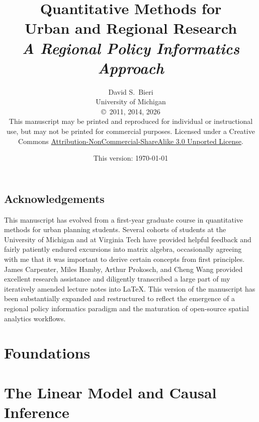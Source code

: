 \documentclass[12pt, a4paper, oneside, openany]{book}
\title{\huge\textbf{Quantitative Methods for\\Urban and Regional Research}\\[10pt]
       \Large\textit{A Regional Policy Informatics Approach}}
\author{\Large David S.\ Bieri\\[4pt]
        \normalsize University of Michigan\\[6pt]
        \footnotesize\copyright~2011, 2014, 2026\\[2pt]
        \scriptsize This manuscript may be printed and reproduced for individual
        or instructional use, but may not be printed for commercial purposes.
        Licensed under a Creative Commons
        \href{http://creativecommons.org/licenses/by-nc-sa/3.0/deed.en_US}{%
        Attribution-NonCommercial-ShareAlike 3.0 Unported License}.}
\date{This version: \today}
\begin{document}
\maketitle
\frontmatter
\setcounter{tocdepth}{2}
\setcounter{page}{3}

\chapter*{Acknowledgements}
This manuscript has evolved from a first-year graduate course in quantitative
methods for urban planning students. Several cohorts of students at the
University of Michigan and at Virginia Tech have provided helpful feedback and
fairly patiently endured excursions into matrix algebra, occasionally agreeing
with me that it was important to derive certain concepts from first principles.
James Carpenter, Miles Hamby, Arthur Prokosch, and Cheng Wang provided
excellent research assistance and diligently transcribed a large part of my
iteratively amended lecture notes into \LaTeX{}. This version of the manuscript
has been substantially expanded and restructured to reflect the emergence of a
regional policy informatics paradigm and the maturation of open-source spatial
analytics workflows.

\tableofcontents
\listoffigures
\listoftables

\mainmatter



\part{Foundations}\label{part1}




\part{The Linear Model and Causal Inference}\label{part2}



\end{document}
